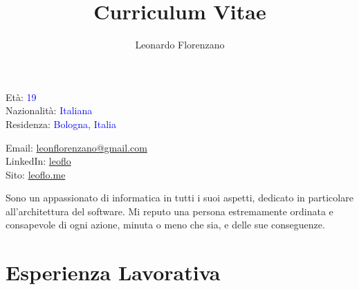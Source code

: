 \documentclass{paper}
\title{Curriculum Vitae}
\author{Leonardo Florenzano}
\begin{document}
\maketitle

\begin{multicols}{2}

\noindent
Età: \textcolor{blue}{19}\\
Nazionalità: \textcolor{blue}{Italiana}\\
Residenza: \textcolor{blue}{Bologna, Italia}

\columnbreak

\noindent
Email: \href{mailto:leonflorenzano@gmail.com}{leonflorenzano@gmail.com}\\
LinkedIn: \href{https://www.linkedin.com/in/leoflo}{leoflo}\\
Sito: \href{https://leoflo.me}{leoflo.me}

\end{multicols}

\noindent
Sono un appassionato di informatica in tutti i suoi aspetti, dedicato in particolare all'architettura del software.
Mi reputo una persona estremamente ordinata e consapevole di ogni azione, minuta o meno che sia, e delle sue conseguenze.

\section{Esperienza Lavorativa}
\end{document}
